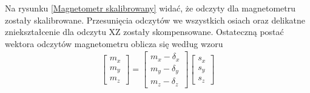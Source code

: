Na rysunku \ref{Magnetometr skalibrowany} widać, że odczyty dla magnetometru zostały skalibrowane. Przesunięcia odczytów we wszystkich osiach oraz delikatne zniekształcenie dla odczytu XZ zostały skompensowane. Ostateczną postać wektora odczytów magnetometru oblicza się według wzoru
$$
    \begin{array}{c}
        \left[
            \begin{array}{c}
                m_x \\
                m_y \\
                m_z
            \end{array}
        \right]
        =
        \left[
            \begin{array}{c}
                m_x - \delta_x \\
                m_y - \delta_y \\
                m_z - \delta_z
            \end{array}
        \right]
        \left[
            \begin{array}{c}
                s_x \\
                s_y \\
                s_z
            \end{array}
        \right]
    \end{array}
    \label{Ostateczny wektor magnetometr}
$$

